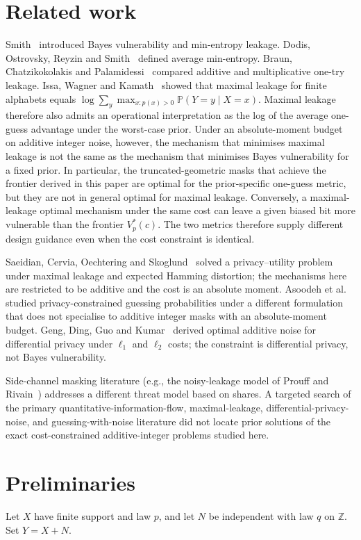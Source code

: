 \documentclass[conference]{IEEEtran}
\newcommand{\Z}{\mathbb{Z}}
\newcommand{\Prob}{\mathbb{P}}
\begin{document}
\section{Related work}
Smith~\cite{Smith09} introduced Bayes vulnerability and min-entropy leakage. Dodis, Ostrovsky, Reyzin and Smith~\cite{DORS08} defined average min-entropy. Braun, Chatzikokolakis and Palamidessi~\cite{BCP09} compared additive and multiplicative one-try leakage. Issa, Wagner and Kamath~\cite{IWK20} showed that maximal leakage for finite alphabets equals \(\log\sum_y\max_{x:p(x)>0}\Prob(Y=y\mid X=x)\). Maximal leakage therefore also admits an operational interpretation as the log of the average one-guess advantage under the worst-case prior. Under an absolute-moment budget on additive integer noise, however, the mechanism that minimises maximal leakage is not the same as the mechanism that minimises Bayes vulnerability for a fixed prior. In particular, the truncated-geometric masks that achieve the frontier derived in this paper are optimal for the prior-specific one-guess metric, but they are not in general optimal for maximal leakage. Conversely, a maximal-leakage optimal mechanism under the same cost can leave a given biased bit more vulnerable than the frontier \(V_p^*(c)\). The two metrics therefore supply different design guidance even when the cost constraint is identical.

Saeidian, Cervia, Oechtering and Skoglund~\cite{SCOS21} solved a privacy--utility problem under maximal leakage and expected Hamming distortion; the mechanisms here are restricted to be additive and the cost is an absolute moment. Asoodeh et al.~\cite{Asoodeh17} studied privacy-constrained guessing probabilities under a different formulation that does not specialise to additive integer masks with an absolute-moment budget. Geng, Ding, Guo and Kumar~\cite{GDGK19} derived optimal additive noise for differential privacy under \(\ell_1\) and \(\ell_2\) costs; the constraint is differential privacy, not Bayes vulnerability.

Side-channel masking literature (e.g., the noisy-leakage model of Prouff and Rivain~\cite{PR13}) addresses a different threat model based on shares. A targeted search of the primary quantitative-information-flow, maximal-leakage, differential-privacy-noise, and guessing-with-noise literature did not locate prior solutions of the exact cost-constrained additive-integer problems studied here.

\section{Preliminaries}
Let \(X\) have finite support and law \(p\), and let \(N\) be independent with law \(q\) on \(\Z\). Set \(Y=X+N\).
\end{document}

